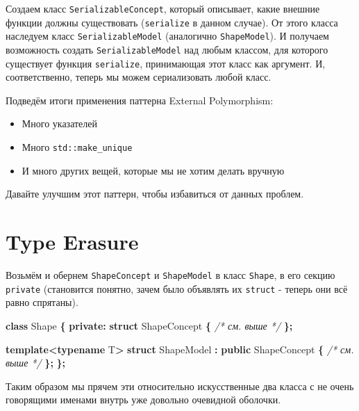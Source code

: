 \documentclass[14pt,a4paper]{article}
\providecommand{\tightlist}{%
	\setlength{\itemsep}{0pt}\setlength{\parskip}{0pt}}
\newenvironment{Shaded}{\begin{paragraph}}{\end{paragraph}}
\newenvironment{Highlighting}{\begin{paragraph}}{\end{paragraph}}
\newcommand{\KeywordTok}[1]{\textcolor[rgb]{0.13,0.29,0.53}{\textbf{#1}}}
\newcommand{\CommentTok}[1]{\textcolor[rgb]{0.56,0.35,0.01}{\textit{#1}}}
\newcommand{\OperatorTok}[1]{\textcolor[rgb]{0.81,0.36,0.00}{\textbf{#1}}}
\newcommand{\NormalTok}[1]{#1}
\begin{document}
Создаем класс \texttt{SerializableConcept}, который описывает, какие
внешние функции должны существовать (\texttt{serialize} в данном
случае). От этого класса наследуем класс \texttt{SerializableModel}
(аналогично \texttt{ShapeModel}). И получаем возможность создать
\texttt{SerializableModel} над любым классом, для которого существует
функция \texttt{serialize}, принимающая этот класс как аргумент. И,
соответственно, теперь мы можем сериализовать любой класс.

Подведём итоги применения паттерна External Polymorphism:

\begin{itemize}
\tightlist
\item
  Много указателей
\item
  Много \texttt{std::make\_unique}
\item
  И много других вещей, которые мы не хотим делать вручную
\end{itemize}

Давайте улучшим этот паттерн, чтобы избавиться от данных проблем.

\hypertarget{type-erasure}{%
\section{Type Erasure}\label{type-erasure}}

Возьмём и обернем \texttt{ShapeConcept} и \texttt{ShapeModel} в класс
\texttt{Shape}, в его секцию \texttt{private} (становится понятно, зачем
было объявлять их \texttt{struct} - теперь они всё равно спрятаны).

\begin{Shaded}
\begin{Highlighting}[]
\KeywordTok{class}\NormalTok{ Shape }\OperatorTok{\{}
\KeywordTok{private}\OperatorTok{:}
    \KeywordTok{struct}\NormalTok{ ShapeConcept }\OperatorTok{\{} \CommentTok{/* см. выше */} \OperatorTok{\};}

    \KeywordTok{template}\OperatorTok{\textless{}}\KeywordTok{typename}\NormalTok{ T}\OperatorTok{\textgreater{}}
    \KeywordTok{struct}\NormalTok{ ShapeModel }\OperatorTok{:} \KeywordTok{public}\NormalTok{ ShapeConcept }\OperatorTok{\{} \CommentTok{/* см. выше */} \OperatorTok{\};}
\OperatorTok{\};}
\end{Highlighting}
\end{Shaded}

Таким образом мы прячем эти относительно искусственные два класса с не
очень говорящими именами внутрь уже довольно очевидной оболочки.
\end{document}
